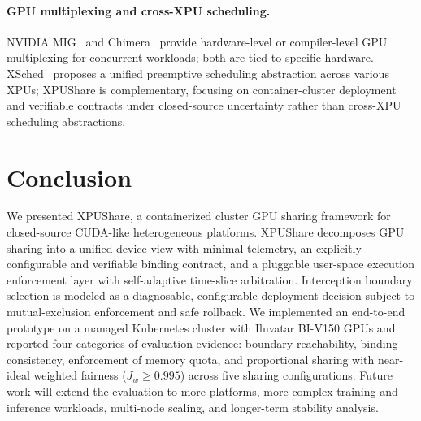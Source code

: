 \documentclass[runningheads,a4paper]{llncs}
\begin{document}
\paragraph{GPU multiplexing and cross-XPU scheduling.}
NVIDIA MIG~\cite{nvidia-mig} and Chimera~\cite{chimera} provide
hardware-level or compiler-level GPU multiplexing for concurrent
workloads; both are tied to specific hardware. XSched~\cite{xsched}
proposes a unified preemptive scheduling abstraction across various XPUs;
XPUShare is complementary, focusing on container-cluster deployment and
verifiable contracts under closed-source uncertainty rather than
cross-XPU scheduling abstractions.

\section{Conclusion}
\label{sec:conclusion}
	
We presented XPUShare, a containerized cluster GPU sharing framework for
closed-source CUDA-like heterogeneous platforms. XPUShare decomposes GPU sharing into a unified device view with minimal telemetry, an
explicitly configurable and verifiable binding contract, and a pluggable
user-space execution enforcement layer with self-adaptive time-slice
arbitration. Interception boundary selection is
modeled as a diagnosable, configurable deployment decision subject to
mutual-exclusion enforcement and safe rollback. We implemented an
end-to-end prototype on a managed Kubernetes cluster with Iluvatar BI-V150
GPUs and reported four categories of evaluation evidence: 
boundary reachability, binding consistency, enforcement of memory quota, and
proportional sharing with near-ideal weighted fairness
($J_w{\geq}0.995$) across five sharing configurations.
Future work will extend the evaluation to more platforms, more complex
training and inference workloads, multi-node scaling, and longer-term
stability analysis.


          
\end{document}
